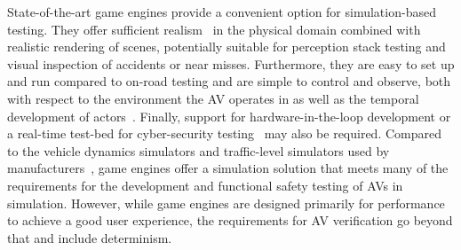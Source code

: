 \documentclass[runningheads,twocolumn,a4paper,10pt]{llncs}
\begin{document}
State-of-the-art game engines provide a convenient option for simulation-based testing. They offer sufficient realism~\cite{Koopman2018} in the physical domain combined with realistic rendering of scenes, potentially suitable for perception stack testing and visual inspection of accidents or near misses. 
%
Furthermore, they are easy to set up and run compared to on-road testing and are simple to control and observe, both with respect to the environment the AV operates in as well as the temporal development of actors~\cite{Ulbrich2015}. 
%
% 
%
Finally, support for hardware-in-the-loop development or a real-time test-bed for cyber-security testing~\cite{Javaid2013} may also be required. %
%
%
Compared to the vehicle dynamics simulators and traffic-level simulators used by manufacturers~\cite{FrameworkAndChallenges}, game engines offer a simulation solution that meets many of the requirements for the development and functional safety testing of AVs in simulation. 
%
However, while game engines are designed primarily for performance to achieve a good user experience, the requirements for AV verification go beyond that and include determinism.
\end{document}
